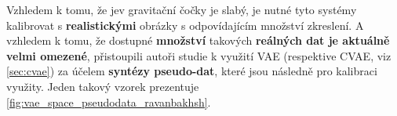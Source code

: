 Vzhledem k tomu, že jev gravitační čočky je slabý, je nutné tyto systémy kalibrovat s \textbf{realistickými} obrázky s odpovídajícím množství zkreslení.
A vzhledem k tomu, že dostupné \textbf{množství} takových \textbf{reálných dat je aktuálně velmi omezené}, přistoupili autoři studie k využití VAE (respektive CVAE, viz \autoref{sec:cvae}) za účelem \textbf{syntézy pseudo-dat}, které jsou následně pro kalibraci využity. Jeden takový vzorek prezentuje \autoref{fig:vae_space_pseudodata_ravanbakhsh}.
